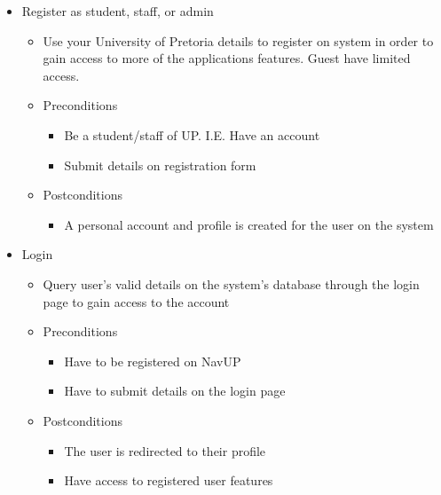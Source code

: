 \documentclass[12pt]{article}
\begin{document}
\begin{enumerate}
\begin{itemize}
				\item Register as student, staff, or admin
				\begin{itemize}
					\item Use your University of Pretoria details to register on system in order to gain access to more of the applications features. Guest have limited access.
					\item Preconditions
					\begin{itemize}
						\item Be a student/staff of UP. I.E. Have an account
						\item Submit details on registration form
					\end{itemize}
					\item Postconditions
					\begin{itemize}
						\item A personal account and profile is created for the user on the system
					\end{itemize}
				\end{itemize}
				
				\item Login
				\begin{itemize}
					\item Query user’s valid details on the system’s database through the login page to gain access to the account 
					\item Preconditions
					\begin{itemize}
						\item Have to be registered on NavUP
						\item Have to submit details on the login page
					\end{itemize}
					\item Postconditions
					\begin{itemize}
						\item The user is redirected to their profile
						\item Have access to registered user features
					\end{itemize}
				\end{itemize}
				

\end{itemize}
\end{enumerate}
\end{document}
